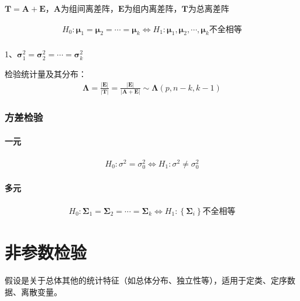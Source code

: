 \documentclass[12pt]{book}
\begin{document}
$\mathbf{T}=\mathbf{A}+\mathbf{E}$，$\mathbf{A}$为组间离差阵，$\bm{E}$为组内离差阵，$\bm{T}$为总离差阵

\begin{gather*}
    H_0:\bm{\mu}_1=\bm{\mu}_2=\cdots=\bm{\mu}_k	\Leftrightarrow H_1:\bm{\mu}_1,\bm{\mu}_2,\cdots,\bm{\mu}_k不全相等 \\
\end{gather*}


1、$\bm{\sigma}_1^2=\bm{\sigma}_2^2=\cdots=\bm{\sigma}_k^2$

检验统计量及其分布：
\begin{gather*}
    \bm{\Lambda}=\frac{\left|\bm{E}\right|}{\left|\bm{T}\right|}=\frac{\left|\bm{E}\right|}{\left|\bm{A}+\bm{E}\right|} \sim\bm{\Lambda}(p,n-k,k-1)
\end{gather*}


\subsubsection{方差检验}

\paragraph{一元}

\begin{gather*}
    H_0:\sigma^2=\sigma_0^2 \Leftrightarrow	H_1:\sigma^2\neq\sigma_0^2
\end{gather*}


\paragraph{多元}

\begin{gather*}
    H_0:\bm{\Sigma}_1=\bm{\Sigma}_2=\cdots=\bm{\Sigma}_k\Leftrightarrow H_1:\left\{\bm{\Sigma}_i\right\}\text{不全相等}
\end{gather*}















\section{非参数检验}



假设是关于总体其他的统计特征（如总体分布、独立性等），适用于定类、定序数据、离散变量。
\end{document}
